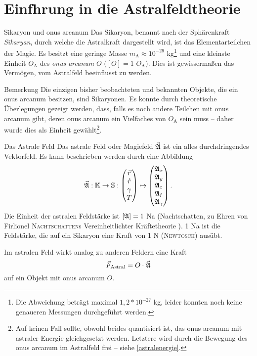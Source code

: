 \section[tocentry=Einführung in die Astralfeldtheorie, head=Einführung in die Astralfeldtheorie]{Einf\uese hrung in die Astralfeldtheorie}
\begin{bla}{Sikaryon und onus arcanum}
Das Sikaryon, benannt nach der Sphärenkraft \emph{Sikaryan}, durch welche die Astralkraft dargestellt wird, ist das Elementarteilchen der Magie. Es besitzt eine geringe Masse $m_\text{A}\approx10^{-29}$ kg\footnote{Die Abweichung beträgt maximal $1,2*10^{-27}$ kg, leider konnten noch keine genaueren Messungen durchgeführt werden.} und eine kleinste Einheit $O_\text{A}$ des \emph{onus arcanum} $O$ ($[O]=1$ $O_\text{A}$). Dies ist gewissermaßen das Vermögen, vom Astralfeld beeinflusst zu werden.
\end{bla}
\begin{bla}{Bemerkung}
Die einzigen bisher beobachteten und bekannten Objekte, die ein onus arcanum besitzen, sind Sikaryonen. Es konnte durch theoretische Überlegungen \cite{quanten} gezeigt werden, dass, falls es noch andere Teilchen mit onus arcanum gibt, deren onus arcanum ein Vielfaches von $O_\text{A}$ sein muss -- daher wurde dies als Einheit gewählt\footnote{Auf keinen Fall sollte, obwohl beides quantisiert ist, das onus arcanum mit astraler Energie gleichgesetzt werden. Letztere wird durch die Bewegung des onus arcanum im Astralfeld frei -- siehe \ref{astralenergie}.}.
\end{bla}
\begin{bla}{Das Astrale Feld}
Das astrale Feld oder Magiefeld $\vec{\mathfrak{A}}$ ist ein alles durchdringendes Vektorfeld. Es kann beschrieben werden durch eine Abbildung
\begin{equation}
\vec{\mathfrak{A}}: \mathbb{K}\to\mathbb{S}: \begin{pmatrix}\vec{r}\\\mathring{r}\\\gamma\\T\end{pmatrix}\mapsto\begin{pmatrix}\mathfrak{A}_x\\\mathfrak{A}_y\\\mathfrak{A}_z\\\mathfrak{A}_{\mathring{r}}\\\mathfrak{A}_\gamma\end{pmatrix}\text{.}
\end{equation}
Die Einheit der astralen Feldstärke ist $[\mathfrak{A}]=1$ Na (Nachtschatten, zu Ehren von Firlionel \textsc{Nachtschatten}s Vereinheitlichter Kräftetheorie \cite{nachtschatten}). 1 Na ist die Feldstärke, die auf ein Sikaryon eine Kraft von 1 N (\textsc{Newtosch}) ausübt.

Im astralen Feld wirkt analog zu anderen Feldern eine Kraft
\begin{equation}
\vec{F}_\text{Astral}=O\cdot\vec{\mathfrak{A}}\label{eq:astralkraft}
\end{equation}
auf ein Objekt mit onus arcanum $O$.
\end{bla}
